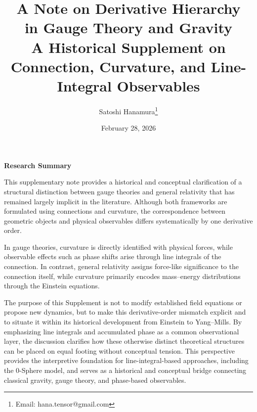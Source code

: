 \documentclass[12pt,letterpaper]{article}
\begin{document}
\title{A Note on Derivative Hierarchy\\ in Gauge Theory and Gravity\\
\normalsize A Historical Supplement on Connection, Curvature, and Line-Integral Observables}

\author{Satoshi Hanamura\thanks{Email: hana.tensor@gmail.com}}
\date{February 28, 2026}

\maketitle

\tableofcontents

\begin{center}
\textbf{Research Summary}
\end{center}

\justifying
This supplementary note provides a historical and conceptual clarification of a structural distinction between gauge theories and general relativity that has remained largely implicit in the literature. Although both frameworks are formulated using connections and curvature, the correspondence between geometric objects and physical observables differs systematically by one derivative order.

In gauge theories, curvature is directly identified with physical forces, while observable effects such as phase shifts arise through line integrals of the connection. In contrast, general relativity assigns force-like significance to the connection itself, while curvature primarily encodes mass--energy distributions through the Einstein equations.

The purpose of this Supplement is not to modify established field equations or propose new dynamics, but to make this derivative-order mismatch explicit and to situate it within its historical development from Einstein to Yang--Mills. By emphasizing line integrals and accumulated phase as a common observational layer, the discussion clarifies how these otherwise distinct theoretical structures can be placed on equal footing without conceptual tension. This perspective provides the interpretive foundation for line-integral-based approaches, including the 0-Sphere model, and serves as a historical and conceptual bridge connecting classical gravity, gauge theory, and phase-based observables.
\end{document}
